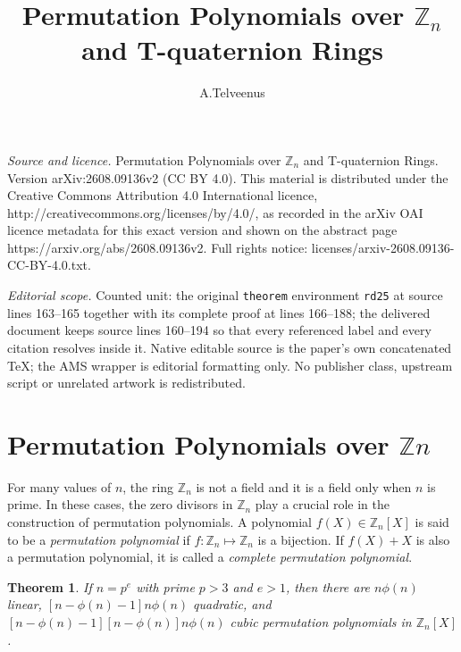 \documentclass[10pt,a4paper]{amsart}
\newtheorem{theorem}{Theorem}
\begin{document}
\title[Permutation Polynomials over mathbbZ_n and T-quaternion Ring]{Permutation Polynomials over $\mathbb{Z}_{n}$ and T-quaternion Rings}
\author{A.Telveenus}
\date{}
\maketitle
\noindent\emph{Source and licence.} Permutation Polynomials over $\mathbb{Z}_{n}$ and T-quaternion Rings. Version arXiv:2608.09136v2 (CC BY 4.0). This material is distributed under the Creative Commons Attribution 4.0 International licence, http://creativecommons.org/licenses/by/4.0/, as recorded in the arXiv OAI licence metadata for this exact version and shown on the abstract page https://arxiv.org/abs/2608.09136v2. Full rights notice: licenses/arxiv-2608.09136-CC-BY-4.0.txt.\par\smallskip
\noindent\textit{Editorial scope.} Counted unit: the original \texttt{theorem} environment \texttt{rd25} at source lines 163--165 together with its complete proof at lines 166--188; the delivered document keeps source lines 160--194 so that every referenced label and every citation resolves inside it. Native editable source is the paper's own concatenated TeX; the AMS wrapper is editorial formatting only. No publisher class, upstream script or unrelated artwork is redistributed.
\section{Permutation Polynomials over $\mathbb{Z}n$}
For many values of $n$, the ring $\mathbb{Z}_{n}$ is not a field and it is a field only when $n$ is prime. In these cases, the zero divisors in $\mathbb{Z}_{n}$ play a crucial role in the construction of permutation polynomials.
A polynomial $f(X) \in \mathbb{Z}_{n}[X]$ is said to be a \textit{permutation polynomial} if $f:\mathbb{Z}_{n} \mapsto \mathbb{Z}_{n}$ is a bijection. If $f(X)+X$ is also a permutation polynomial, it is called a \textit{complete permutation polynomial}. 

\begin{theorem} \label{rd25}
If $n=p^{e}$ with prime $p>3$ and $e>1$, then there are $n \phi(n)$ linear, $[n-\phi(n)-1]n \phi(n)$ quadratic, and $[n-\phi(n)-1][n-\phi(n)]n \phi(n)$ cubic permutation polynomials in $\mathbb{Z}_{n}[X]$.
\end{theorem}
\end{document}

